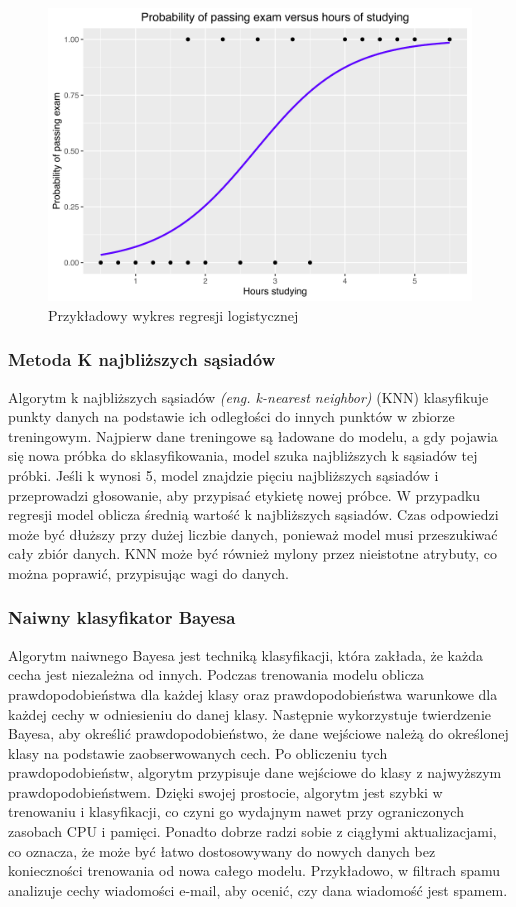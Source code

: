 \documentclass[12pt,a4paper]{article}
\begin{document}
\begin{figure}[h]
    \centering
    \includegraphics[width=0.75\linewidth]{images/ligistic-curve.png}
    \caption{Przykładowy wykres regresji logistycznej \cite{logistic-regression-graph}}
\end{figure}

\subsubsection{Metoda K najbliższych sąsiadów} 
Algorytm k najbliższych sąsiadów \textit{(eng. k-nearest neighbor)} (KNN) klasyfikuje punkty danych na podstawie ich odległości do innych punktów w zbiorze treningowym. Najpierw dane treningowe są ładowane do modelu, a gdy pojawia się nowa próbka do sklasyfikowania, model szuka najbliższych k sąsiadów tej próbki. Jeśli k wynosi 5, model znajdzie pięciu najbliższych sąsiadów i przeprowadzi głosowanie, aby przypisać etykietę nowej próbce. W przypadku regresji model oblicza średnią wartość k najbliższych sąsiadów. Czas odpowiedzi może być dłuższy przy dużej liczbie danych, ponieważ model musi przeszukiwać cały zbiór danych. KNN może być również mylony przez nieistotne atrybuty, co można poprawić, przypisując wagi do danych.

\subsubsection{Naiwny klasyfikator Bayesa} 
Algorytm naiwnego Bayesa jest techniką klasyfikacji, która zakłada, że każda cecha jest niezależna od innych. Podczas trenowania modelu oblicza prawdopodobieństwa dla każdej klasy oraz prawdopodobieństwa warunkowe dla każdej cechy w odniesieniu do danej klasy. Następnie wykorzystuje twierdzenie Bayesa, aby określić prawdopodobieństwo, że dane wejściowe należą do określonej klasy na podstawie zaobserwowanych cech. Po obliczeniu tych prawdopodobieństw, algorytm przypisuje dane wejściowe do klasy z najwyższym prawdopodobieństwem. Dzięki swojej prostocie, algorytm jest szybki w trenowaniu i klasyfikacji, co czyni go wydajnym nawet przy ograniczonych zasobach CPU i pamięci. Ponadto dobrze radzi sobie z ciągłymi aktualizacjami, co oznacza, że może być łatwo dostosowywany do nowych danych bez konieczności trenowania od nowa całego modelu. Przykładowo, w filtrach spamu analizuje cechy wiadomości e-mail, aby ocenić, czy dana wiadomość jest spamem.
\end{document}
